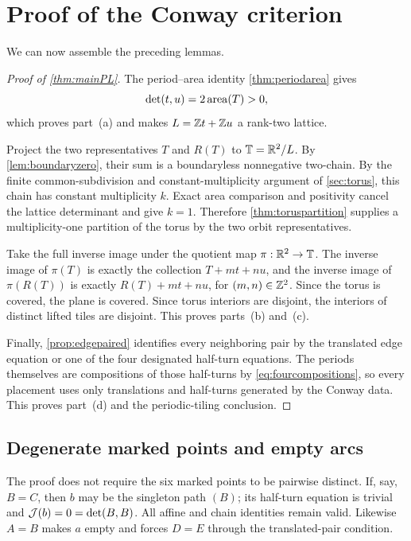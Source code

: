 \section{Proof of the Conway criterion}
\label{sec:mainproof}

We can now assemble the preceding lemmas.

\begin{proof}[Proof of \cref{thm:mainPL}]
The period--area identity \cref{thm:periodarea} gives
\[
 \det(t,u)=2\operatorname{area}(T)>0,
\]
which proves part~(a) and makes \(L=\mathbb Z t+\mathbb Z u\) a rank-two lattice.

Project the two representatives \(T\) and \(R(T)\) to \(\mathbb T=\mathbb R^2/L\).  By \cref{lem:boundaryzero}, their sum is a boundaryless nonnegative two-chain.  By the finite common-subdivision and constant-multiplicity argument of \cref{sec:torus}, this chain has constant multiplicity \(k\).  Exact area comparison and positivity cancel the lattice determinant and give \(k=1\).  Therefore \cref{thm:toruspartition} supplies a multiplicity-one partition of the torus by the two orbit representatives.

Take the full inverse image under the quotient map \(\pi:\mathbb R^2\to\mathbb T\).  The inverse image of \(\pi(T)\) is exactly the collection \(T+mt+nu\), and the inverse image of \(\pi(R(T))\) is exactly \(R(T)+mt+nu\), for \((m,n)\in\mathbb Z^2\).  Since the torus is covered, the plane is covered.  Since torus interiors are disjoint, the interiors of distinct lifted tiles are disjoint.  This proves parts~(b) and~(c).

Finally, \cref{prop:edgepaired} identifies every neighboring pair by the translated edge equation or one of the four designated half-turn equations.  The periods themselves are compositions of those half-turns by \cref{eq:fourcompositions}, so every placement uses only translations and half-turns generated by the Conway data.  This proves part~(d) and the periodic-tiling conclusion.
\end{proof}

\subsection{Degenerate marked points and empty arcs}

The proof does not require the six marked points to be pairwise distinct.  If, say, \(B=C\), then \(b\) may be the singleton path \((B)\); its half-turn equation is trivial and \(\mathcal J(b)=0=\det(B,B)\).  All affine and chain identities remain valid.  Likewise \(A=B\) makes \(a\) empty and forces \(D=E\) through the translated-pair condition.

